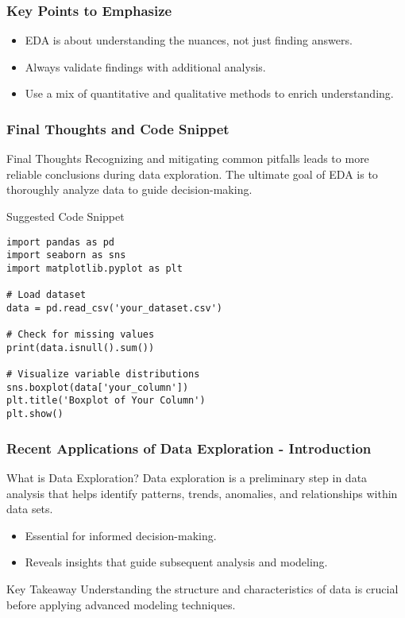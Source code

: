 \documentclass[aspectratio=169]{beamer}
\begin{document}
\begin{frame}
    \frametitle{Key Points to Emphasize}
    \begin{itemize}
        \item EDA is about understanding the nuances, not just finding answers.
        \item Always validate findings with additional analysis.
        \item Use a mix of quantitative and qualitative methods to enrich understanding.
    \end{itemize}
\end{frame}

\begin{frame}[fragile]
    \frametitle{Final Thoughts and Code Snippet}
    \begin{block}{Final Thoughts}
        Recognizing and mitigating common pitfalls leads to more reliable conclusions during data exploration. 
        The ultimate goal of EDA is to thoroughly analyze data to guide decision-making.
    \end{block}

    \begin{block}{Suggested Code Snippet}
        \begin{lstlisting}
import pandas as pd
import seaborn as sns
import matplotlib.pyplot as plt

# Load dataset
data = pd.read_csv('your_dataset.csv')

# Check for missing values
print(data.isnull().sum())

# Visualize variable distributions
sns.boxplot(data['your_column'])
plt.title('Boxplot of Your Column')
plt.show()
        \end{lstlisting}
    \end{block}
\end{frame}

\begin{frame}[fragile]
    \frametitle{Recent Applications of Data Exploration - Introduction}
    \begin{block}{What is Data Exploration?}
        Data exploration is a preliminary step in data analysis that helps identify patterns, trends, anomalies, and relationships within data sets.
    \end{block}
    \begin{itemize}
        \item Essential for informed decision-making.
        \item Reveals insights that guide subsequent analysis and modeling.
    \end{itemize}
    \begin{block}{Key Takeaway}
        Understanding the structure and characteristics of data is crucial before applying advanced modeling techniques.
    \end{block}
\end{frame}
\end{document}
